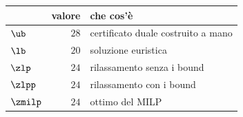 \begin{center}\small
\begin{tabular}{lrl}
\toprule
 & valore & che cos'è \\
\midrule
$\ub$ & $28$ & certificato duale costruito a mano \\
$\lb$ & $20$ & soluzione euristica \\
$\zlp$ & $24$ & rilassamento senza i bound \\
$\zlpp$ & $24$ & rilassamento con i bound \\
$\zmilp$ & $24$ & ottimo del MILP \\
\bottomrule
\end{tabular}
\end{center}

